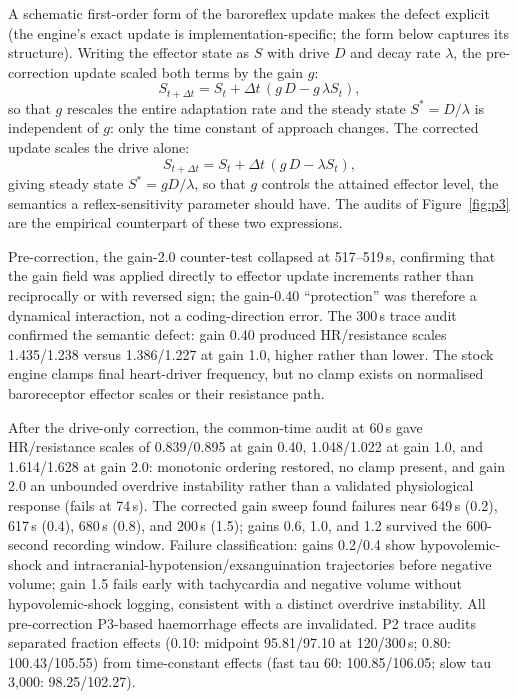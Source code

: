 \documentclass[preprint,12pt,nopreprintline]{elsarticle}
\begin{document}
A schematic first-order form of the baroreflex update makes the defect explicit (the engine's exact update is implementation-specific; the form below captures its structure). Writing the effector state as $S$ with drive $D$ and decay rate $\lambda$, the pre-correction update scaled both terms by the gain $g$:
\begin{equation*}
S_{t+\Delta t} = S_t + \Delta t\,(g\,D - g\,\lambda S_t),
\end{equation*}
so that $g$ rescales the entire adaptation rate and the steady state $S^* = D/\lambda$ is independent of $g$: only the time constant of approach changes. The corrected update scales the drive alone:
\begin{equation*}
S_{t+\Delta t} = S_t + \Delta t\,(g\,D - \lambda S_t),
\end{equation*}
giving steady state $S^* = gD/\lambda$, so that $g$ controls the attained effector level, the semantics a reflex-sensitivity parameter should have. The audits of Figure~\ref{fig:p3} are the empirical counterpart of these two expressions.

Pre-correction, the gain-2.0 counter-test collapsed at 517--519\,s, confirming that the gain field was applied directly to effector update increments rather than reciprocally or with reversed sign; the gain-0.40 ``protection'' was therefore a dynamical interaction, not a coding-direction error. The 300\,s trace audit confirmed the semantic defect: gain 0.40 produced HR/resistance scales 1.435/1.238 versus 1.386/1.227 at gain 1.0, higher rather than lower. The stock engine clamps final heart-driver frequency, but no clamp exists on normalised baroreceptor effector scales or their resistance path.

After the drive-only correction, the common-time audit at 60\,s gave HR/resistance scales of 0.839/0.895 at gain 0.40, 1.048/1.022 at gain 1.0, and 1.614/1.628 at gain 2.0: monotonic ordering restored, no clamp present, and gain 2.0 an unbounded overdrive instability rather than a validated physiological response (fails at 74\,s). The corrected gain sweep found failures near 649\,s (0.2), 617\,s (0.4), 680\,s (0.8), and 200\,s (1.5); gains 0.6, 1.0, and 1.2 survived the 600-second recording window. Failure classification: gains 0.2/0.4 show hypovolemic-shock and intracranial-hypotension\slash exsanguination trajectories before negative volume; gain 1.5 fails early with tachycardia and negative volume without hypovolemic-shock logging, consistent with a distinct overdrive instability. All pre-correction P3-based haemorrhage effects are invalidated. P2 trace audits separated fraction effects (0.10: midpoint 95.81/97.10 at 120/300\,s; 0.80: 100.43/105.55) from time-constant effects (fast tau 60: 100.85/106.05; slow tau 3{,}000: 98.25/102.27).
\end{document}
